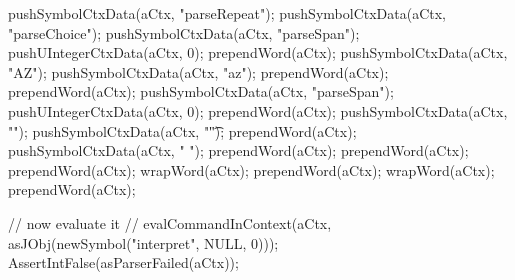   pushSymbolCtxData(aCtx, "parseRepeat");
  pushSymbolCtxData(aCtx, "parseChoice");
  pushSymbolCtxData(aCtx, "parseSpan");
  pushUIntegerCtxData(aCtx, 0);
  prependWord(aCtx);
  pushSymbolCtxData(aCtx, "AZ");
  pushSymbolCtxData(aCtx, "az");
  prependWord(aCtx);
  prependWord(aCtx);
  pushSymbolCtxData(aCtx, "parseSpan");
  pushUIntegerCtxData(aCtx, 0);
  prependWord(aCtx);
  pushSymbolCtxData(aCtx, "\n");
  pushSymbolCtxData(aCtx, "\t");
  prependWord(aCtx);
  pushSymbolCtxData(aCtx, " ");
  prependWord(aCtx);
  prependWord(aCtx);
  prependWord(aCtx);
  wrapWord(aCtx);
  prependWord(aCtx);
  wrapWord(aCtx);
  prependWord(aCtx);
  
  // now evaluate it
//  evalCommandInContext(aCtx, asJObj(newSymbol("interpret", NULL, 0)));
  AssertIntFalse(asParserFailed(aCtx));
\stopCTest
\skipTestCase
\stopTestSuite